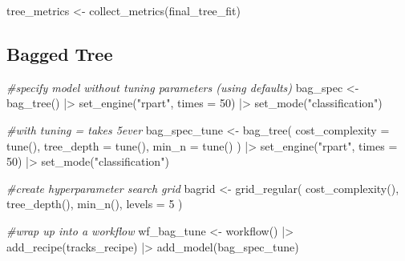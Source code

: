\documentclass[
]{article}
\newenvironment{Shaded}{\begin{snugshade}}{\end{snugshade}}
\newcommand{\AttributeTok}[1]{\textcolor[rgb]{0.77,0.63,0.00}{#1}}
\newcommand{\CommentTok}[1]{\textcolor[rgb]{0.56,0.35,0.01}{\textit{#1}}}
\newcommand{\DecValTok}[1]{\textcolor[rgb]{0.00,0.00,0.81}{#1}}
\newcommand{\FunctionTok}[1]{\textcolor[rgb]{0.00,0.00,0.00}{#1}}
\newcommand{\NormalTok}[1]{#1}
\newcommand{\OtherTok}[1]{\textcolor[rgb]{0.56,0.35,0.01}{#1}}
\newcommand{\SpecialCharTok}[1]{\textcolor[rgb]{0.00,0.00,0.00}{#1}}
\newcommand{\StringTok}[1]{\textcolor[rgb]{0.31,0.60,0.02}{#1}}
\begin{document}
\begin{Shaded}
\begin{Highlighting}[]
\NormalTok{tree\_metrics }\OtherTok{\textless{}{-}} \FunctionTok{collect\_metrics}\NormalTok{(final\_tree\_fit)}
\end{Highlighting}
\end{Shaded}

\hypertarget{bagged-tree}{%
\subsection{Bagged Tree}\label{bagged-tree}}

\begin{Shaded}
\begin{Highlighting}[]
\CommentTok{\#specify model without tuning parameters (using defaults)}
\NormalTok{bag\_spec }\OtherTok{\textless{}{-}} \FunctionTok{bag\_tree}\NormalTok{() }\SpecialCharTok{|\textgreater{}} 
  \FunctionTok{set\_engine}\NormalTok{(}\StringTok{"rpart"}\NormalTok{, }\AttributeTok{times =} \DecValTok{50}\NormalTok{) }\SpecialCharTok{|\textgreater{}} 
  \FunctionTok{set\_mode}\NormalTok{(}\StringTok{"classification"}\NormalTok{)}

\CommentTok{\#with tuning = takes 5ever}
\NormalTok{bag\_spec\_tune }\OtherTok{\textless{}{-}} \FunctionTok{bag\_tree}\NormalTok{(}
  \AttributeTok{cost\_complexity =} \FunctionTok{tune}\NormalTok{(),}
  \AttributeTok{tree\_depth =} \FunctionTok{tune}\NormalTok{(),}
  \AttributeTok{min\_n =} \FunctionTok{tune}\NormalTok{()}
\NormalTok{) }\SpecialCharTok{|\textgreater{}} 
  \FunctionTok{set\_engine}\NormalTok{(}\StringTok{"rpart"}\NormalTok{, }\AttributeTok{times =} \DecValTok{50}\NormalTok{) }\SpecialCharTok{|\textgreater{}} 
  \FunctionTok{set\_mode}\NormalTok{(}\StringTok{"classification"}\NormalTok{)}

\CommentTok{\#create hyperparameter search grid}
\NormalTok{bagrid }\OtherTok{\textless{}{-}} \FunctionTok{grid\_regular}\NormalTok{(}
  \FunctionTok{cost\_complexity}\NormalTok{(),}
  \FunctionTok{tree\_depth}\NormalTok{(),}
  \FunctionTok{min\_n}\NormalTok{(),}
  \AttributeTok{levels =} \DecValTok{5}
\NormalTok{)}

\CommentTok{\#wrap up into a workflow}
\NormalTok{wf\_bag\_tune }\OtherTok{\textless{}{-}} \FunctionTok{workflow}\NormalTok{() }\SpecialCharTok{|\textgreater{}} 
  \FunctionTok{add\_recipe}\NormalTok{(tracks\_recipe) }\SpecialCharTok{|\textgreater{}} 
  \FunctionTok{add\_model}\NormalTok{(bag\_spec\_tune)}
\end{Highlighting}
\end{Shaded}
\end{document}
